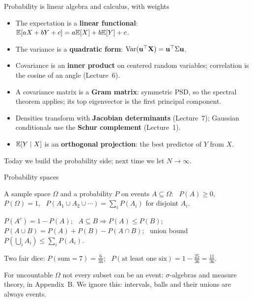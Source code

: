 \documentclass[aspectratio=1610,11pt]{beamer}
\begin{document}
\begin{frame}{Probability is linear algebra and calculus, with weights}
    \small
    \begin{itemize}
        \item The expectation is a \textbf{linear functional}: $\mathbb{E}[aX + bY + c] = a\mathbb{E}[X] + b\mathbb{E}[Y] + c$.
        \item The variance is a \textbf{quadratic form}: $\operatorname{Var}(\mathbf{u}^\top\mathbf{X}) = \mathbf{u}^\top\Sigma\mathbf{u}$.
        \item Covariance is an \textbf{inner product} on centered random variables; correlation is the cosine of an angle (Lecture~6).
        \item A covariance matrix is a \textbf{Gram matrix}: symmetric PSD, so the spectral theorem applies; its top eigenvector is the first principal component.
        \item Densities transform with \textbf{Jacobian determinants} (Lecture~7); Gaussian conditionals use the \textbf{Schur complement} (Lecture~1).
        \item $\mathbb{E}[Y \mid X]$ is an \textbf{orthogonal projection}: the best predictor of $Y$ from $X$.
    \end{itemize}
    Today we build the probability side; next time we let $N \to \infty$.
\end{frame}


\begin{frame}{Probability spaces}
    \begin{definition}
        \small A sample space $\Omega$ and a probability $P$ on events $A \subseteq \Omega$: \ $P(A) \geq 0$, \ $P(\Omega) = 1$, \ $P(A_1 \cup A_2 \cup \cdots) = \sum_iP(A_i)$ for disjoint $A_i$.
    \end{definition}
    \begin{proposition}
        \small $P(A^c) = 1 - P(A)$; \ $A \subseteq B \Rightarrow P(A) \leq P(B)$; \ $P(A \cup B) = P(A) + P(B) - P(A \cap B)$; \ union bound $P(\bigcup_iA_i) \leq \sum_iP(A_i)$.
    \end{proposition}
    \begin{example}[][ex:dice]
        \small Two fair dice: $P(\text{sum} = 7) = \frac{6}{36}$; \ $P(\text{at least one six}) = 1 - \frac{25}{36} = \frac{11}{36}$.
    \end{example}
    \small For uncountable $\Omega$ not every subset can be an event: $\sigma$-algebras and measure theory, in Appendix~B. We ignore this: intervals, balls and their unions are always events.
\end{frame}
\end{document}
